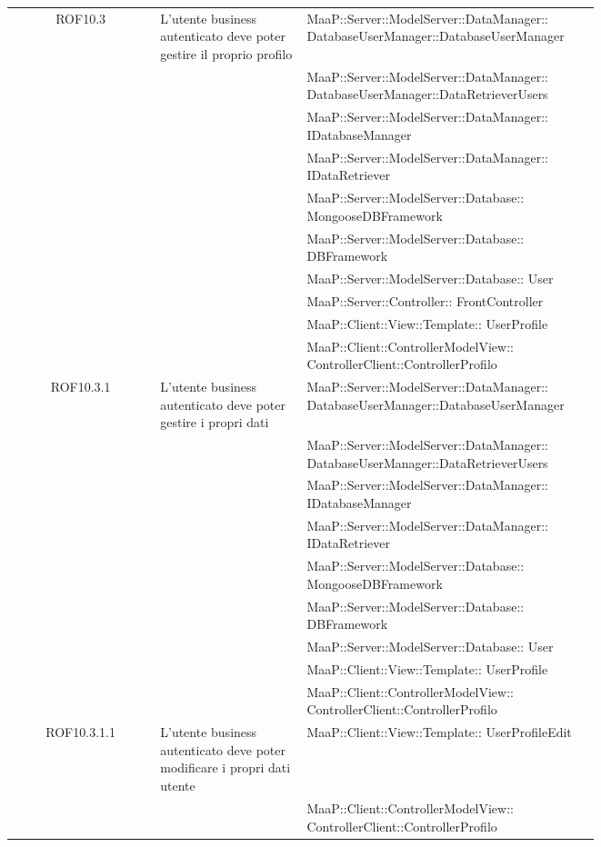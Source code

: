 \begin{center}
\begin{longtable}{|c|p{0.25\linewidth}|p{0.5\linewidth}|}
\midrule
ROF10.3
& L'utente business autenticato deve poter gestire il proprio profilo
& MaaP::Server::ModelServer::DataManager:: DatabaseUserManager::DatabaseUserManager\\
& & MaaP::Server::ModelServer::DataManager:: DatabaseUserManager::DataRetrieverUsers\\
& & MaaP::Server::ModelServer::DataManager:: IDatabaseManager\\
& & MaaP::Server::ModelServer::DataManager:: IDataRetriever\\
& & MaaP::Server::ModelServer::Database:: MongooseDBFramework\\
& & MaaP::Server::ModelServer::Database:: DBFramework\\
& & MaaP::Server::ModelServer::Database:: User\\
& & MaaP::Server::Controller:: FrontController\\
& & MaaP::Client::View::Template:: UserProfile\\
& & MaaP::Client::ControllerModelView:: ControllerClient::ControllerProfilo\\

\midrule
ROF10.3.1
& L'utente business autenticato deve poter gestire i propri dati
& MaaP::Server::ModelServer::DataManager:: DatabaseUserManager::DatabaseUserManager\\
& & MaaP::Server::ModelServer::DataManager:: DatabaseUserManager::DataRetrieverUsers\\
& & MaaP::Server::ModelServer::DataManager:: IDatabaseManager\\
& & MaaP::Server::ModelServer::DataManager:: IDataRetriever\\
& & MaaP::Server::ModelServer::Database:: MongooseDBFramework\\
& & MaaP::Server::ModelServer::Database:: DBFramework\\
& & MaaP::Server::ModelServer::Database:: User\\
& & MaaP::Client::View::Template:: UserProfile\\
& & MaaP::Client::ControllerModelView:: ControllerClient::ControllerProfilo\\

\midrule
ROF10.3.1.1
& L'utente business autenticato deve poter modificare i propri dati utente
& MaaP::Client::View::Template:: UserProfileEdit\\
& & MaaP::Client::ControllerModelView:: ControllerClient::ControllerProfilo\\


\end{longtable}
\end{center}
